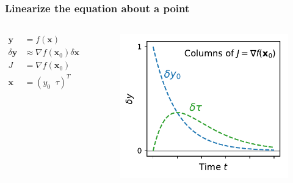 \documentclass[xcolor={dvipsnames}]{beamer}
\begin{document}
\begin{frame}
\frametitle{Linearize the equation about a point}
\begin{columns}
        \begin{align*}
        \mathbf{y}& = f(\mathbf{x}) \\
        \delta \mathbf{y}& \approx \nabla f(\mathbf{x}_0) \delta \mathbf{x} \\
        J& = \nabla f(\mathbf{x}_0) \\
        \mathbf{x}& = (y_0 \; \; \tau)^T
        \end{align*}

        \begin{figure}
        \includegraphics[width=\textwidth]{figs/dy0dtau.pdf}
        \end{figure}
\end{columns}
\end{frame}
\end{document}
